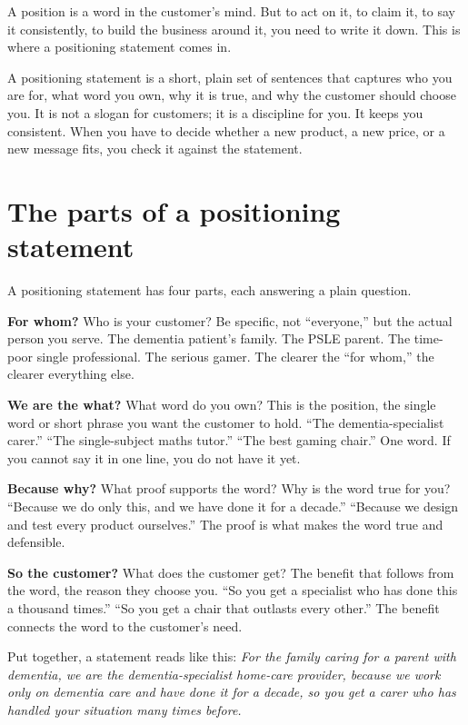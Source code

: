 \documentclass[10pt,twoside,openany]{memoir}
\newcommand{\needspacehead}{\needspace{4\baselineskip}}
\let\oldsection\section
\renewcommand{\section}{\needspacehead\oldsection}
\begin{document}
{A position is a word in the customer's mind. But to act on it, to claim
it, to say it consistently, to build the business around it, you need to
write it down. This is where a positioning statement comes in.

A positioning statement is a short, plain set of sentences that captures
who you are for, what word you own, why it is true, and why the customer
should choose you. It is not a slogan for customers; it is a discipline
for you. It keeps you consistent. When you have to decide whether a new
product, a new price, or a new message fits, you check it against the
statement.

\section{The parts of a positioning
statement}\label{the-parts-of-a-positioning-statement}

A positioning statement has four parts, each answering a plain question.

\textbf{For whom?} Who is your customer? Be specific, not ``everyone,''
but the actual person you serve. The dementia patient's family. The PSLE
parent. The time-poor single professional. The serious gamer. The
clearer the ``for whom,'' the clearer everything else.

\textbf{We are the what?} What word do you own? This is the position,
the single word or short phrase you want the customer to hold. ``The
dementia-specialist carer.'' ``The single-subject maths tutor.'' ``The
best gaming chair.'' One word. If you cannot say it in one line, you do
not have it yet.

\textbf{Because why?} What proof supports the word? Why is the word true
for you? ``Because we do only this, and we have done it for a decade.''
``Because we design and test every product ourselves.'' The proof is
what makes the word true and defensible.

\textbf{So the customer?} What does the customer get? The benefit that
follows from the word, the reason they choose you. ``So you get a
specialist who has done this a thousand times.'' ``So you get a chair
that outlasts every other.'' The benefit connects the word to the
customer's need.

Put together, a statement reads like this: \emph{For the family caring
for a parent with dementia, we are the dementia-specialist home-care
provider, because we work only on dementia care and have done it for a
decade, so you get a carer who has handled your situation many times
before.}

}
\end{document}
